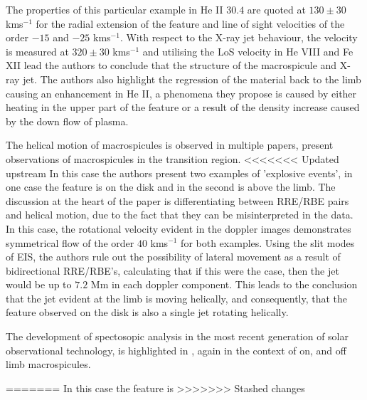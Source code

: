 The properties of this particular example in He II $30.4$ are quoted at $130 \pm 30$ kms${^{-1}}$ for the radial extension of the feature and line of sight velocities of the order $-15$ and $-25$ kms${^{-1}}$.
With respect to the X-ray jet behaviour, the velocity is measured at $320 \pm 30$ kms${^{-1}}$ and utilising the LoS velocity in He VIII and Fe XII lead the authors to conclude that the structure of the macrospicule and X-ray jet. 
The authors also highlight the regression of the material back to the limb causing an enhancement in He II, a phenomena they propose is caused by either heating in the upper part of the feature or a result of the density increase caused by the down flow of plasma.

The helical motion of macrospicules is observed in multiple papers, \cite{Curdt2011} present observations of macrospicules in the transition region.
<<<<<<< Updated upstream
In this case the authors present two examples of 'explosive events', in one case the feature is on the disk and in the second is above the limb.
The discussion at the heart of the paper is differentiating between RRE/RBE pairs and helical motion, due to the fact that they can be misinterpreted in the data. 
In this case, the rotational velocity evident in the doppler images demonstrates symmetrical flow of the order $40$ kms${^{-1}}$ for both examples.
Using the slit modes of EIS, the authors rule out the possibility of lateral movement as a result of bidirectional RRE/RBE's, calculating that if this were the case, then the jet would be up to $7.2$ Mm in each doppler component.
This leads to the conclusion that the jet evident at the limb is moving helically, and consequently, that the feature observed on the disk is also a single jet rotating helically.

The development of spectosopic analysis in the most recent generation of solar observational technology, is highlighted in \cite{Scullion2010}, again in the context of on, and off limb macrospicules. 







=======
In this case the feature is  
>>>>>>> Stashed changes

















